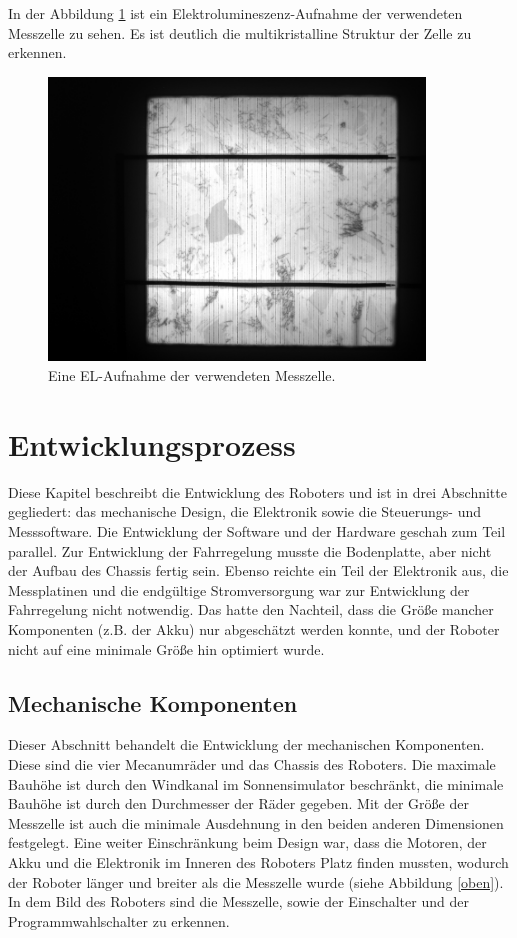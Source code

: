 \documentclass[a4paper,bibtotoc,oneside]{scrbook}
\begin{document}
In der Abbildung \ref{el} ist ein Elektrolumineszenz-Aufnahme der verwendeten Messzelle zu sehen. Es ist deutlich die multikristalline Struktur der Zelle zu erkennen. 

\begin{figure}[htbp]
\centering
\includegraphics[width=100mm]{img/el.png}
\caption{Eine EL-Aufnahme der verwendeten Messzelle.}\label{el}
\end{figure}

\chapter{Entwicklungsprozess}\thispagestyle{empty}

Diese Kapitel beschreibt die Entwicklung des Roboters und ist in drei Abschnitte gegliedert: das mechanische Design, die Elektronik sowie die Steuerungs- und Messsoftware.
Die Entwicklung der Software und der Hardware geschah zum Teil parallel. Zur Entwicklung der Fahrregelung musste die Bodenplatte, aber nicht der Aufbau des Chassis fertig sein. Ebenso reichte ein Teil der Elektronik aus, die Messplatinen und die endgültige Stromversorgung war zur Entwicklung der Fahrregelung nicht notwendig. Das hatte den Nachteil, dass die Größe mancher Komponenten (z.B. der Akku) nur abgeschätzt werden konnte, und der Roboter nicht auf eine minimale Größe hin optimiert wurde.

\section{Mechanische Komponenten}\thispagestyle{empty}

Dieser Abschnitt behandelt die Entwicklung der mechanischen Komponenten. Diese sind die vier Mecanumräder und das Chassis des Roboters. Die maximale Bauhöhe ist durch den Windkanal im Sonnensimulator beschränkt, die minimale Bauhöhe ist durch den Durchmesser der Räder gegeben.
Mit der Größe der Messzelle ist auch die minimale Ausdehnung in den beiden anderen Dimensionen festgelegt. Eine weiter Einschränkung beim Design war, dass die Motoren, der Akku und die Elektronik im Inneren des Roboters Platz finden mussten, wodurch der Roboter länger und breiter als die Messzelle wurde (siehe Abbildung \ref{oben}). In dem Bild des Roboters sind die Messzelle, sowie der Einschalter und der Programmwahlschalter zu erkennen.
\end{document}
